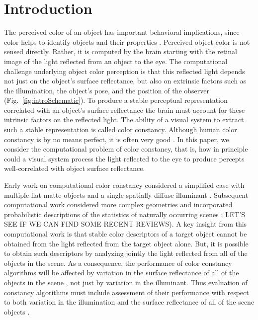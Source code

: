 \documentclass{jov}
\begin{document}
\section{Introduction}
The perceived color of an object has important behavioral implications, since color helps to identify objects and their properties \cite{Mollon89, Jacobs81}.
Perceived object color is not sensed directly. Rather, it is computed by the brain starting with the retinal image of the light reflected from an object to the eye.
The computational challenge underlying object color perception is that this reflected light depends not just on the object's surface reflectance, but also on extrinsic factors such as the illumination, the object's pose, and the position of the observer (Fig.~\ref{fig:introSchematic}).
To produce a stable perceptual representation correlated with an object's surface reflectance the brain must account for these intrinsic factors on the reflected light.
The ability of a visual system to extract such a stable representation is called color constancy. Although human color constancy is by no means perfect, it is often very good \cite{FosterColorConstancy, BrainardColorConstancy}. 
In this paper, we consider the computational problem of color constancy, that is, how in principle could a visual system process the light reflected to the eye to produce percepts well-correlated with object surface reflectance.

Early work on computational color constancy considered a simplified case with multiple flat matte objects and a single spatially diffuse illuminant \cite{LandRetinex,Buchsbaum80,MaloneyWandell86}. Subsequent computational work considered more complex geometries and incorporated probabilistic descriptions of the statistics of naturally occurring scenes \cite{funt1988color, D'ZmuraConstancy3, barron2012color, D'ZmuraIversonSinger,BrainardFreeman}; LET'S SEE IF WE CAN FIND SOME RECENT REVIEWS).
A key insight from this computational work is that stable color descriptors of a target object cannot be obtained from the light reflected from the target object alone.  But, it is possible to obtain such descriptors by analyzing jointly the light reflected from all of the objects in the scene.
As a consequence, the performance of color constancy algorithms will be affected by variation in the surface reflectance of all of the objects in the scene \cite{BrainardWandellRetinex}, not just by variation in the illuminant. Thus evaluation of constancy algorithms must include assessment of their performance with respect to both variation in the illumination and the surface reflectance of all of the scene objects \cite{BrainardWandellRetinex,BrainardFreeman}. 
\end{document}
